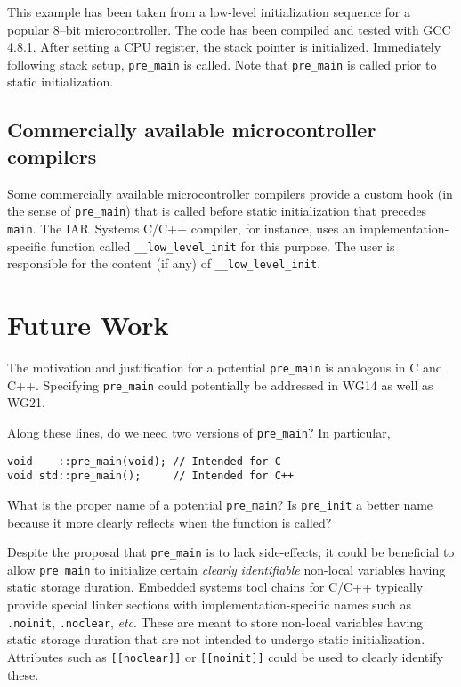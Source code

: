 \documentclass[11pt]{article}
\begin{document}
This example has been taken from a low-level initialization
sequence for a popular 8--bit microcontroller. The code has
been compiled and tested with GCC 4.8.1. After setting a
CPU register, the stack pointer is initialized.
Immediately following stack setup, \lstinline{pre_main} is called.
Note that \lstinline{pre_main} is called prior to
static initialization.

\subsection*{Commercially available microcontroller compilers}

Some commercially available microcontroller compilers provide
a custom hook (in the sense of \lstinline{pre_main}) that
is called before static initialization that precedes \lstinline{main}.
The IAR~Systems C/C++ compiler, for instance, uses
an implementation-specific function called \lstinline{__low_level_init}
for this purpose. The user is responsible for the content (if any)
of \lstinline{__low_level_init}.

\section{Future Work}

The motivation and justification for a potential \lstinline{pre_main}
is analogous in C and C++. Specifying \lstinline{pre_main}
could potentially be addressed in WG14 as well as WG21.

Along these lines, do we need two versions of \lstinline{pre_main}?
In particular,

\begin{lstlisting}
void    ::pre_main(void); // Intended for C
void std::pre_main();     // Intended for C++
\end{lstlisting}

What is the proper name of a potential \lstinline{pre_main}?
Is \lstinline{pre_init} a better name because it
more clearly reflects when the function is called?

Despite the proposal that \lstinline{pre_main} is to lack side-effects,
it could be beneficial to allow \lstinline{pre_main} to initialize certain
\emph{clearly} \emph{identifiable} non-local variables
having static storage duration.
Embedded systems tool chains for C/C++ typically provide special
linker sections with implementation-specific names such as
\lstinline{.noinit}, \lstinline{.noclear}, \emph{etc}. These are meant
to store non-local variables having static storage duration that are not
intended to undergo static initialization.
Attributes such as \lstinline{[[noclear]]} or \lstinline{[[noinit]]}
could be used to clearly identify these.
\end{document}

